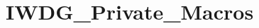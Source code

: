 \hypertarget{group___i_w_d_g___private___macros}{\section{I\-W\-D\-G\-\_\-\-Private\-\_\-\-Macros}
\label{group___i_w_d_g___private___macros}
}
